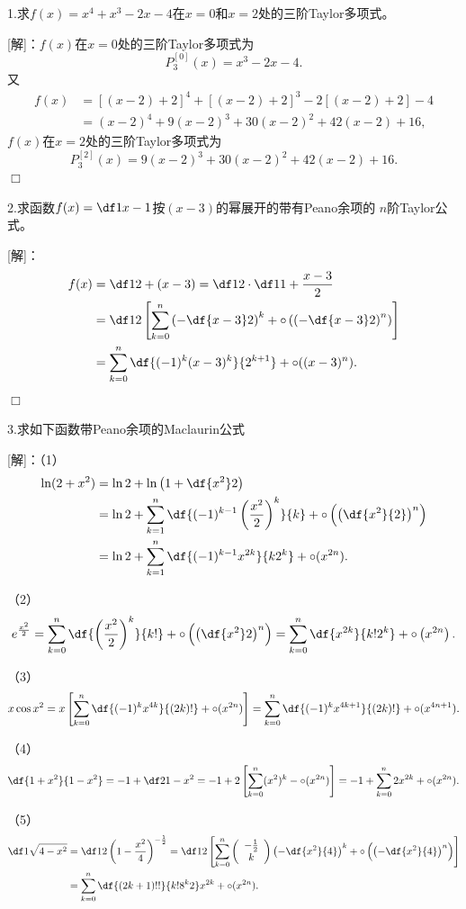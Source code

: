 \bigskip

1.求$f(x)=x^4+x^3-2x-4$在$x=0$和$x=2$处的三阶Taylor多项式。

[解]：$f(x)$在$x=0$处的三阶Taylor多项式为
$$P^{[0]}_3(x)=x^3-2x-4.$$
又
\begin{align*}
	f(x)&=[(x-2)+2]^4+[(x-2)+2]^3-2[(x-2)+2]-4\\
	&=(x-2)^4+9(x-2)^3+30(x-2)^2+42(x-2)+16,
\end{align*}
$f(x)$在$x=2$处的三阶Taylor多项式为
$$P^{[2]}_3(x)=9(x-2)^3+30(x-2)^2+42(x-2)+16.$$
\hfill$\Box$

\bigskip

2.求函数$f(x)=\df1{x-1}$按$(x-3)$的幂展开的带有Peano余项的
$n$阶Taylor公式。

[解]：
\begin{align*}
	f(x)&=\df1{2+(x-3)}=\df12\cdot\df1{1+\frac{x-3}2}\\
	&=\df12\left[\sum\limits_{k=0}^n\left(-\df{x-3}2\right)^k
	+\circ\left(\left(-\df{x-3}2\right)^n\right)\right]\\
	&=\sum\limits_{k=0}^n\df{(-1)^k(x-3)^k}{2^{k+1}}+\circ((x-3)^n).
\end{align*}
\hfill$\Box$

\bigskip

3.求如下函数带Peano余项的Maclaurin公式

[解]：（1）
\begin{align*}
	\ln(2+x^2)&=\ln2+\ln\left(1+\df{x^2}2\right)\\
	&=\ln2+\sum\limits_{k=1}^n\df{(-1)^{k-1}\left(\frac{x^2}{2}\right)^k}{k}
	+\circ\left(\left(\df{x^2}{2}\right)^n\right)\\
	&=\ln2+\sum\limits_{k=1}^n\df{(-1)^{k-1}x^{2k}}{k2^k}
	+\circ(x^{2n}).
\end{align*}

（2）
$$
	e^{\frac{x^2}2}
	=\sum\limits_{k=0}^n\df{\left(\frac{x^2}2\right)^k}{k!}
	+\circ\left(\left(\df{x^2}2\right)^n\right)
	=\sum\limits_{k=0}^n\df{x^{2k}}{k!2^k}
	+\circ\left(x^{2n}\right).
$$

（3）
$$
	x\cos x^2
	=x\left[\sum\limits_{k=0}^n\df{(-1)^kx^{4k}}{(2k)!}
	+\circ(x^{2n})\right]
	=\sum\limits_{k=0}^n\df{(-1)^kx^{4k+1}}{(2k)!}
	+\circ(x^{4n+1}).
$$

（4）
$$
	\df{1+x^2}{1-x^2}
	=-1+\df2{1-x^2}
	=-1+2\left[\sum\limits_{k=0}^n(x^2)^k-\circ(x^{2n})\right]
	=-1+\sum\limits_{k=0}^n2x^{2k}+\circ(x^{2n}).
$$

（5）
\begin{align*}
	\df1{\sqrt{4-x^2}}
	&=\df12\left(1-\frac{x^2}4\right)^{-\frac12}
	=\df12\left[\sum\limits_{k=0}^n\left(\begin{array}{c}
		-\frac12 \\ k
	\end{array}\right)\left(-\df{x^2}{4}\right)^k
	+\circ\left(\left(-\df{x^2}{4}\right)^n\right)
	\right]\\
	&=\sum\limits_{k=0}^n\df{(2k+1)!!}{k!8^k2}x^{2k}
	+\circ(x^{2n}).
\end{align*}

